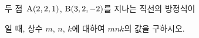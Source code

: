 두 점~$\mathrm{A}(2{,}\mkern3mu\mathopen{}2{,}\mkern3mu\mathopen{}1)$, $\mathrm{B}(3{,}\mkern3mu\mathopen{}2{,}\mkern3mu\mathopen{}-2)$를 지나는 직선의 방정식이 \par\smallskip{}\par\smallskip\noindent 일 때, 상수 $m$, $n$, $k$에 대하여 $mnk$의 값을 구하시오.
